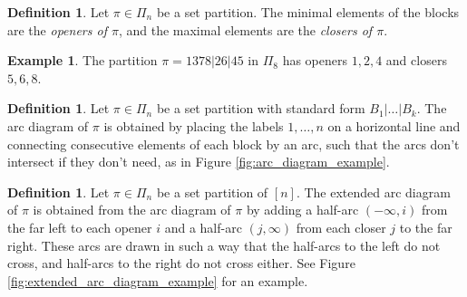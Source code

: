 \documentclass[11pt]{amsart}
\numberwithin{figure}{section}
\theoremstyle{plain}
\theoremstyle{definition}
\newtheorem{definition}[theorem]{Definition}
\newtheorem{example}[theorem]{Example}
\begin{document}
\begin{definition}\label{defn:openers_closers}
Let $\pi\in\Pi_n$ be a set partition. The minimal elements of the blocks are the {\em openers of $\pi$}, and the maximal elements are the {\em closers of $\pi$}.
\end{definition}
	
\begin{example}
The partition $\pi=1378|26|45$ in $\Pi_8$ has openers $1,2,4$ and closers $5,6,8$.
\end{example}
	
\begin{definition}\label{defn:arc_diagram}
Let $\pi\in\Pi_n$ be a set partition with standard form $B_1|\dots|B_k$. The arc diagram of $\pi$ is obtained by placing the labels $1,\dots,n$ on a horizontal line and connecting consecutive elements of each block by an arc, such that the arcs don't intersect if they don't need, as in Figure \ref{fig:arc_diagram_example}.
\end{definition}
	
\begin{definition}\label{defn:extended_arc_diagram}
Let $\pi\in\Pi_n$ be a set partition of $[n]$. The extended arc diagram of $\pi$ is obtained from the arc diagram of $\pi$ by adding a half-arc $(-\infty,i)$ from the far left to each opener $i$ and a half-arc $(j, \infty)$ from each closer $j$ to the far right. These arcs are drawn in such a way that the half-arcs to the left do not cross, and half-arcs to the right do not cross either. See Figure \ref{fig:extended_arc_diagram_example} for an example.
\end{definition}
	
\end{document}

